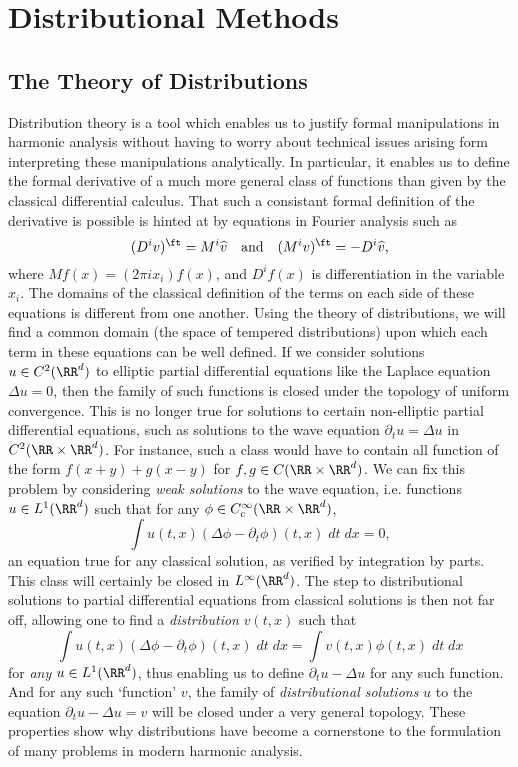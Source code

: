 
\part{Distributional Methods}

\chapter{The Theory of Distributions}

Distribution theory is a tool which enables us to justify formal manipulations in harmonic analysis without having to worry about technical issues arising form interpreting these manipulations analytically. In particular, it enables us to define the formal derivative of a much more general class of functions than given by the classical differential calculus. That such a consistant formal definition of the derivative is possible is hinted at by equations in Fourier analysis such as
%
\[ (D^i v)^\ft = M^i \widehat{v} \quad\text{and}\quad (M^i v)^\ft = -D^i \widehat{v}, \]
%
where $Mf(x) = (2 \pi i x_i) f(x)$, and $D^i f(x)$ is differentiation in the variable $x_i$. The domains of the classical definition of the terms on each side of these equations is different from one another. Using the theory of distributions, we will find a common domain (the space of tempered distributions) upon which each term in these equations can be well defined. If we consider solutions $u \in C^2(\RR^d)$ to elliptic partial differential equations like the Laplace equation $\Delta u = 0$, then the family of such functions is closed under the topology of uniform convergence. This is no longer true for solutions to certain non-elliptic partial differential equations, such as solutions to the wave equation $\partial_t u = \Delta u$ in $C^2(\RR \times \RR^d)$. For instance, such a class would have to contain all function of the form $f(x + y) + g(x - y)$ for $f,g \in C(\RR \times \RR^d)$. We can fix this problem by considering \emph{weak solutions} to the wave equation, i.e. functions $u \in L^1(\RR^d)$ such that for any $\phi \in C_c^\infty(\RR \times \RR^d)$,
%
\[ \int u(t,x) (\Delta \phi - \partial_t \phi)(t,x)\; dt\; dx = 0, \]
%
an equation true for any classical solution, as verified by integration by parts. This class will certainly be closed in $L^\infty(\RR^d)$. The step to distributional solutions to partial differential equations from classical solutions is then not far off, allowing one to find a \emph{distribution} $v(t,x)$ such that
%
\[ \int u(t,x) (\Delta \phi - \partial_t \phi)(t,x)\; dt\; dx = \int v(t,x) \phi(t,x)\; dt\; dx \]
%
for \emph{any} $u \in L^1(\RR^d)$, thus enabling us to define $\partial_t u - \Delta u$ for any such function. And for any such `function' $v$, the family of \emph{distributional solutions} $u$ to the equation $\partial_t u - \Delta u = v$ will be closed under a very general topology. These properties show why distributions have become a cornerstone to the formulation of many problems in modern harmonic analysis.

